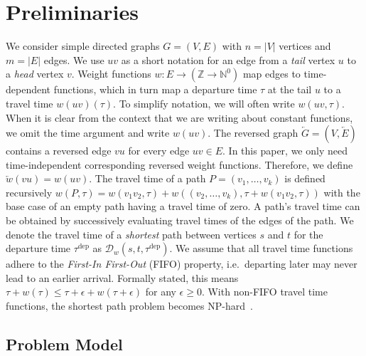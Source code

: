 \documentclass[a4paper,UKenglish,cleveref, autoref, thm-restate]{lipics-v2021}
\newcommand*{\dist}{\mathcal{D}}
\newcommand*{\tdep}{\tau^{\operatorname{dep}}}
\begin{document}
\section{Preliminaries}
We consider simple directed graphs $G=(V,E)$ with $n=|V|$ vertices and $m=|E|$ edges.
We use $uv$ as a short notation for an edge from a \emph{tail} vertex $u$ to a \emph{head} vertex $v$.
Weight functions $w : E \to (\mathbb{Z} \to \mathbb{N}^0)$ map edges to time-dependent functions, which in turn map a departure time $\tau$ at the tail $u$ to a travel time $w(uv)(\tau)$.
To simplify notation, we will often write $w(uv, \tau)$.
When it is clear from the context that we are writing about constant functions, we omit the time argument and write $w(uv)$.
The reversed graph $\overleftarrow{G} = (V, \overleftarrow{E})$ contains a reversed edge $vu$ for every edge $uv \in E$.
In this paper, we only need time-independent corresponding reversed weight functions.
Therefore, we define $\overleftarrow{w}(vu) = w(uv)$.
The travel time of a path $P = (v_1,\dots,v_k)$ is defined recursively $w(P, \tau) = w(v_1 v_2, \tau) + w((v_2,\dots,v_k), \tau + w(v_1 v_2, \tau))$ with the base case of an empty path having a travel time of zero.
A path's travel time can be obtained by successively evaluating travel times of the edges of the path.
We denote the travel time of a \emph{shortest} path between vertices $s$ and $t$ for the departure time $\tdep$ as $\dist_w(s,t,\tdep)$.
We assume that all travel time functions adhere to the \emph{First-In First-Out} (FIFO) property, i.e.\ departing later may never lead to an earlier arrival.
Formally stated, this means $\tau + w(\tau) \leq \tau + \epsilon + w(\tau + \epsilon)$ for any $\epsilon \geq 0$.
With non-FIFO travel time functions, the shortest path problem becomes \textsf{NP}-hard~\cite{or-tnp-89,z-nphsp-22}.

\subsection{Problem Model}
\end{document}
